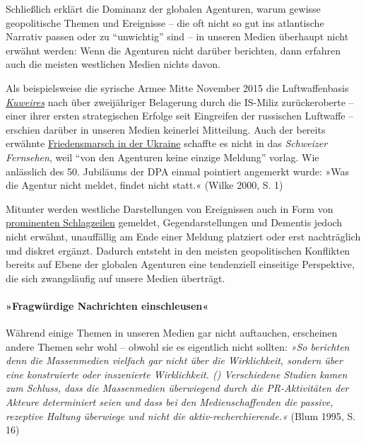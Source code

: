 Schließlich erklärt die Dominanz der globalen Agenturen, warum gewisse
geopolitische Themen und Ereignisse -- die oft nicht so gut ins
atlantische Narrativ passen oder zu ``unwichtig'' sind -- in unseren
Medien überhaupt nicht erwähnt werden: Wenn die Agenturen nicht darüber
berichten, dann erfahren auch die meisten westlichen Medien nichts
davon.

Als beispielsweise die syrische Armee Mitte November 2015 die
Luftwaffenbasis
\emph{\href{https://en.wikipedia.org/wiki/Kuweires_offensive_\%28September\%E2\%80\%93November_2015\%29}{Kuweires}}
nach über zweijähriger Belagerung durch die IS-Miliz zurückeroberte --
einer ihrer ersten strategischen Erfolge seit Eingreifen der russischen
Luftwaffe -- erschien darüber in unseren Medien keinerlei Mitteilung.
Auch der bereits erwähnte
\href{http://www.srf.ch/sendungen/hallosrf/warum-berichtet-srf-nicht-ueber-den-friedensmarsch-in-der-ukraine}{Friedensmarsch
in der Ukraine} schaffte es nicht in das \emph{Schweizer Fernsehen},
weil ``von den Agenturen keine einzige Meldung'' vorlag. Wie anlässlich
des 50. Jubiläums der DPA einmal pointiert angemerkt wurde: »Was die
Agentur nicht meldet, findet nicht statt.« (Wilke 2000, S. 1)

Mitunter werden westliche Darstellungen von Ereignissen auch in Form von
\href{http://www.reuters.com/article/us-mideast-crisis-syria-idlib-toll-idUSKCN0YM0GO}{prominenten
Schlagzeilen} gemeldet, Gegen­darstellungen und Dementis jedoch nicht
erwähnt, unauffällig am Ende einer Meldung platziert oder erst
nachträglich und diskret ergänzt. Dadurch entsteht in den meisten
geopolitischen Konflikten bereits auf Ebene der globalen Agenturen eine
tendenziell einseitige Perspektive, die sich zwangsläufig auf unsere
Medien überträgt.

\hypertarget{fragwuxfcrdige-nachrichten-einschleusen}{%
\paragraph{»Fragwürdige Nachrichten
einschleusen«}\label{fragwuxfcrdige-nachrichten-einschleusen}}

Während einige Themen in unseren Medien gar nicht auftauchen, erscheinen
andere Themen sehr wohl -- obwohl sie es eigentlich nicht sollten:
\emph{»So berichten denn die Massenmedien vielfach gar nicht über die
Wirklichkeit, sondern über eine konstruierte oder inszenierte
Wirklichkeit. () Verschiedene Studien kamen zum Schluss, dass die
Massenmedien überwiegend durch die PR-Aktivitäten der Akteure
determiniert seien und dass bei den Medien­schaffenden die passive,
rezeptive Haltung überwiege und nicht die aktiv-recherchierende.«} (Blum
1995, S. 16)

